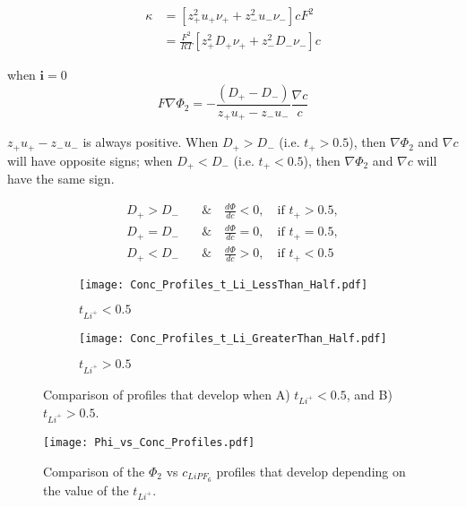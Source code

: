 \documentclass[12pt]{article}
\newcommand{\solcur}{\mathrm{\mathbf{i}}}
\begin{document}
	\begin{align*}
		\kappa &= 
		\left[ z_+^2 u_+ \nu_+ + z_-^2 u_- \nu_- \right] c F^2
		\\
		&= \frac{F^2}{RT} \left[ z_+^2 D_+ \nu_+ + z_-^2 D_- \nu_- \right] c 
	\end{align*}

	when $\solcur = 0$
	\begin{equation}
		F\nabla \Phi_2 = -\frac{(D_+ - D_-)}{z_+ u_+ - z_- u_-} \frac{\nabla c}{c}
	\end{equation}

	$z_+ u_+ - z_- u_-$ is always positive. When $D_+ > D_-$ (i.e. $t_+ > 0.5$), then $\nabla \Phi_2$ and $\nabla c$ will have opposite signs; when $D_+ < D_-$ (i.e. $t_+ < 0.5$), then $\nabla \Phi_2$ and $\nabla c$ will have the same sign.

	\begin{align*}
		D_+ > D_-& \quad \& \quad \frac{d\Phi}{dc} < 0, \quad \text{if } t_{+} > 0.5, \\
		D_+ = D_-& \quad \& \quad \frac{d\Phi}{dc} = 0, \quad \text{if } t_+ = 0.5, \\
		D_+ < D_-& \quad \& \quad \frac{d\Phi}{dc} > 0, \quad \text{if } t_+ < 0.5
	\end{align*}

	\clearpage
	\begin{figure}
		\centering
		\begin{subfigure}{0.5\textwidth}
		  \centering
		  \texttt{[image: Conc\_Profiles\_t\_Li\_LessThan\_Half.pdf]}
		  \caption{$t_{Li^+} < 0.5$}
		  \label{fig:ECEMC_t_lt_Half}
		\end{subfigure}%
		\begin{subfigure}{0.5\textwidth}
		  \centering
		  \texttt{[image: Conc\_Profiles\_t\_Li\_GreaterThan\_Half.pdf]}
		  \caption{$t_{Li^+} > 0.5$}
		  \label{fig:ECEMC_t_gt_Half}
		\end{subfigure}
		\caption{Comparison of profiles that develop when A) $t_{Li^+} < 0.5$, and B) $t_{Li^+} > 0.5$. }
		\label{fig:fig:ECEMC_t_lt_gt_Half}
	\end{figure}


	\begin{figure}[h]
		\centering
		\texttt{[image: Phi\_vs\_Conc\_Profiles.pdf]}
		\caption{Comparison of the $\Phi_2$ vs $c_{LiPF_6}$ profiles that develop depending on the value of the $t_{Li^+}$.}
		\label{fig:dPhi_dc}
	\end{figure}
\end{document}
